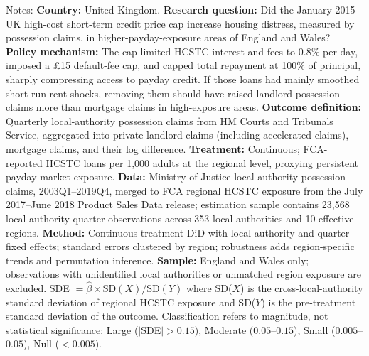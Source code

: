 \begin{table}[H]
\begin{threeparttable}
\begin{flushleft}
Notes: \textbf{Country:} United Kingdom. \textbf{Research question:} Did the January 2015 UK high-cost short-term credit price cap increase housing distress, measured by possession claims, in higher-payday-exposure areas of England and Wales? \textbf{Policy mechanism:} The cap limited HCSTC interest and fees to 0.8\% per day, imposed a \pounds 15 default-fee cap, and capped total repayment at 100\% of principal, sharply compressing access to payday credit. If those loans had mainly smoothed short-run rent shocks, removing them should have raised landlord possession claims more than mortgage claims in high-exposure areas. \textbf{Outcome definition:} Quarterly local-authority possession claims from HM Courts and Tribunals Service, aggregated into private landlord claims (including accelerated claims), mortgage claims, and their log difference. \textbf{Treatment:} Continuous; FCA-reported HCSTC loans per 1,000 adults at the regional level, proxying persistent payday-market exposure. \textbf{Data:} Ministry of Justice local-authority possession claims, 2003Q1--2019Q4, merged to FCA regional HCSTC exposure from the July 2017--June 2018 Product Sales Data release; estimation sample contains 23,568 local-authority-quarter observations across 353 local authorities and 10 effective regions. \textbf{Method:} Continuous-treatment DiD with local-authority and quarter fixed effects; standard errors clustered by region; robustness adds region-specific trends and permutation inference. \textbf{Sample:} England and Wales only; observations with unidentified local authorities or unmatched region exposure are excluded. SDE $= \hat{\beta} \times \text{SD}(X) / \text{SD}(Y)$ where SD($X$) is the cross-local-authority standard deviation of regional HCSTC exposure and SD($Y$) is the pre-treatment standard deviation of the outcome. Classification refers to magnitude, not statistical significance: Large ($|$SDE$| > 0.15$), Moderate ($0.05$--$0.15$), Small ($0.005$--$0.05$), Null ($< 0.005$).
\end{flushleft}
\end{threeparttable}
\label{tab:sde}
\end{table}

